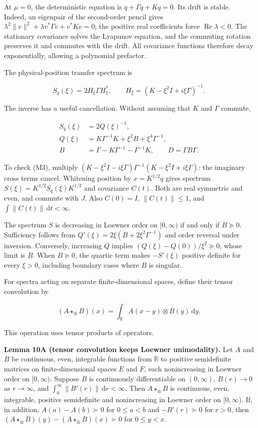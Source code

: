 \documentclass[
  british,
  11pt,
  a4paper,
]{article}
\begin{document}
At \(\mu=0\), the deterministic equation is
\(\ddot q+\Gamma\dot q+Kq=0\). Its drift is stable. Indeed, an eigenpair
of the second-order pencil gives
\(\lambda^2\|v\|^2+\lambda v^*\Gamma v+v^*Kv=0\); the positive real
coefficients force \(\mathop{\mathrm{Re}}\lambda<0\). The stationary
covariance solves the Lyapunov equation, and the commuting rotation
preserves it and commutes with the drift. All covariance functions
therefore decay exponentially, allowing a polynomial prefactor.

The physical-position transfer spectrum is

\[
S_q(\xi)=2H_\xi\Gamma H_\xi^*,\qquad
H_\xi=(K-\xi^2I+i\xi\Gamma)^{-1}.
\]

The inverse has a useful cancellation. Without assuming that \(K\) and
\(\Gamma\) commute,

\[
\begin{aligned}
S_q(\xi)&=2Q(\xi)^{-1},\\
Q(\xi)&=K\Gamma^{-1}K+\xi^2B+\xi^4\Gamma^{-1},\\
B&=\Gamma-K\Gamma^{-1}-\Gamma^{-1}K,\qquad D=\Gamma B\Gamma.
\end{aligned} \tag{M3}
\]

To check (M3), multiply
\((K-\xi^2I-i\xi\Gamma)\Gamma^{-1}(K-\xi^2I+i\xi\Gamma)\): the imaginary
cross terms cancel. Whitening position by \(x=K^{1/2}q\) gives spectrum
\(S(\xi)=K^{1/2}S_q(\xi)K^{1/2}\) and covariance \(C(t)\). Both are real
symmetric and even, and commute with \(J\). Also \(C(0)=I\),
\(\|C(t)\|\le1\), and \(\int\|C(t)\|\,\mathrm dt<\infty\).

The spectrum \(S\) is decreasing in Loewner order on \([0,\infty)\) if
and only if \(B\succeq0\). Sufficiency follows from
\(Q'(\xi)=2\xi(B+2\xi^2\Gamma^{-1})\) and order reversal under
inversion. Conversely, increasing \(Q\) implies
\((Q(\xi)-Q(0))/\xi^2\succeq0\), whose limit is \(B\). When
\(B\succeq0\), the quartic term makes \(-S'(\xi)\) positive definite for
every \(\xi>0\), including boundary cases where \(B\) is singular.

For spectra acting on separate finite-dimensional spaces, define their
tensor convolution by

\[
(A\star_\otimes B)(x)=\int_{\mathbb R}A(x-y)\otimes B(y)\,\mathrm dy. \tag{M4}
\]

This operation uses tensor products of operators.

\textbf{Lemma 10A (tensor convolution keeps Loewner unimodality).} Let
\(A\) and \(B\) be continuous, even, integrable functions from
\(\mathbb R\) to positive semidefinite matrices on finite-dimensional
spaces \(E\) and \(F\), each nonincreasing in Loewner order on
\([0,\infty)\). Suppose \(B\) is continuously differentiable on
\((0,\infty)\), \(B(r)\to0\) as \(r\to\infty\), and
\(\int_0^\infty\|B'(r)\|\,\mathrm dr<\infty\). Then \(A\star_\otimes B\)
is continuous, even, integrable, positive semidefinite and nonincreasing
in Loewner order on \([0,\infty)\). If, in addition, \(A(a)-A(b)\succ0\)
for \(0\le a<b\) and \(-B'(r)\succ0\) for \(r>0\), then
\((A\star_\otimes B)(y)-(A\star_\otimes B)(x)\succ0\) for \(0\le y<x\).
\end{document}

